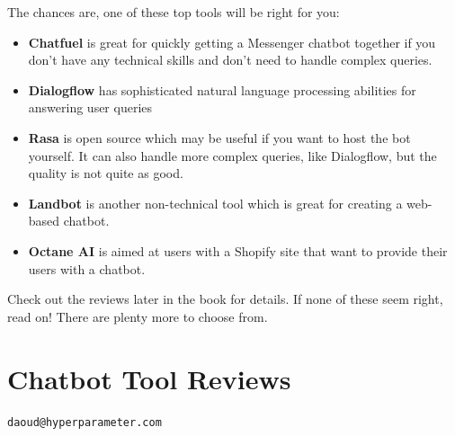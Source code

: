\documentclass[ebook,article,11pt]{memoir}
\begin{document}
The chances are, one of these top tools will be right for you:
\begin{itemize}
\item \textbf{Chatfuel} is great for quickly getting a Messenger
  chatbot together if you don't have any technical skills and don't
  need to handle complex queries.
\item \textbf{Dialogflow} has sophisticated natural language
  processing abilities for answering user queries
\item \textbf{Rasa} is open source which may be useful if you want to
  host the bot yourself. It can also handle more complex queries, like
  Dialogflow, but the quality is not quite as good.
\item \textbf{Landbot} is another non-technical tool which is great
  for creating a web-based chatbot.
\item \textbf{Octane AI} is aimed at users with a Shopify site that
  want to provide their users with a chatbot.
\end{itemize}

Check out the reviews later in the book for details. If none of these
seem right, read on! There are plenty more to choose from.

\chapter{Chatbot Tool Reviews}



\vspace{0.5cm}
\noindent
\begin{block}
\texttt{daoud@hyperparameter.com}
\end{block}
\end{document}
